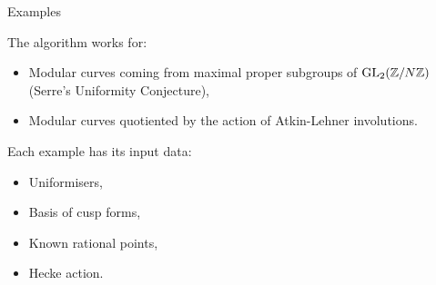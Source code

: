 \begin{frame}{Examples}

The algorithm works for:

\begin{itemize}
\item Modular curves coming from maximal proper subgroups of $\operatorname{GL}_2(\mathbb{Z}/N\mathbb{Z})$ (Serre's Uniformity Conjecture),
\item Modular curves quotiented by the action of Atkin-Lehner involutions.
\end{itemize}

Each example has its input data:

\begin{itemize}
\item Uniformisers,
\item Basis of cusp forms,
\item Known rational points,
\item Hecke action.
\end{itemize}
\end{frame}